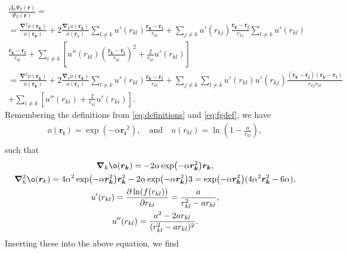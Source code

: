 \begin{gather*}
	\frac{\Delta_k \Psi _T(\boldsymbol{r})}{\Psi _T(\boldsymbol{r})} = \\
	= \frac{\boldsymbol{\nabla} ^2ø(\boldsymbol{r_k})}{ø(\boldsymbol{r_k})}+ 2 \frac{\boldsymbol{\nabla }_k ø(\boldsymbol{r_k})}{ø(\boldsymbol{r}_k)}\sum_{l \neq k}^{} u'(r _{kl}) \frac{\boldsymbol{r_k}-\boldsymbol{r_l}}{r _{kl}}
	+\sum_{j \neq k}^{} u'(r _{kj})
	\frac{\boldsymbol{r_k}-\boldsymbol{r_j}}{r _{kj}}
	\sum_{l \neq k}^{} u'(r _{kl})\\
	\frac{\boldsymbol{r_k}-\boldsymbol{r_l}}{r _{kl}}+ \sum_{i \neq k}
	\left[u''(r _{kl}) \left( \frac{\boldsymbol{r_k}-\boldsymbol{r_l}}{r
			_{kl}}\right)^2+\frac{2}{r _{kl}}u'(r _{kl})\right]\\
	=\frac{\boldsymbol{\nabla} ^2ø(\boldsymbol{r_k})}{ø(\boldsymbol{r_k})}+ 2 \frac{\boldsymbol{\nabla }_k ø(\boldsymbol{r_k})}{ø(\boldsymbol{r}_k)}\sum_{l \neq k}^{} u'(r _{kl}) \frac{\boldsymbol{r_k}-\boldsymbol{r_l}}{r _{kl}}
	+\sum_{j \neq k}^{} \sum_{l \neq k}^{} u'(r _{kl})u'(r
		_{kj})\frac{(\boldsymbol{r_k}-\boldsymbol{r_j})(\boldsymbol{r_k}-\boldsymbol{r_l})}{r
		_{kj}r _{kl}}\\
	+\sum_{i \neq k}^{} \left[u''(r _{ki})+\frac{2}{r _{ki}}u'(r _{ki})\right].
\end{gather*}
Remembering the definitions from \autoref{eq:definitions} and
\autoref{eq:fgdef}, we have
\begin{gather*}
	ø(\boldsymbol{r_i}) = \exp(-\alpha \boldsymbol{r_i}^2), \quad \text{and}
	\quad u(r _{kl})=\ln(1-\frac{a}{r _{kl}}),\\
\end{gather*}
such that
\begin{gather*}
	\grad_kø(\boldsymbol{r_k}) = -2\alpha \exp(-\alpha \boldsymbol{r_k}^2)
	\boldsymbol{r_k},\\
	\grad^2_k ø(\boldsymbol{r}_k) = 4\alpha^2 \exp(-\alpha
	\boldsymbol{r_k}^2)\boldsymbol{r_k}^2-2\alpha \exp(-\alpha
	\boldsymbol{r_k}^2)3=\exp(-\alpha \boldsymbol{r_k}^2)(4\alpha ^2
	\boldsymbol{r_k}^2-6\alpha ),\\
	u'(r _{kl}) = \frac{\partial \ln(f(r _{kl}))}{\partial r _{kl}} =
	\frac{a}{r _{kl}^2-ar _{kl}},\\
	u''(r _{kl}) = \frac{a^2-2ar _{kl}}{(r _{kl}^2-ar _{kl})^2}.
\end{gather*}
Inserting these into the above equation, we find
